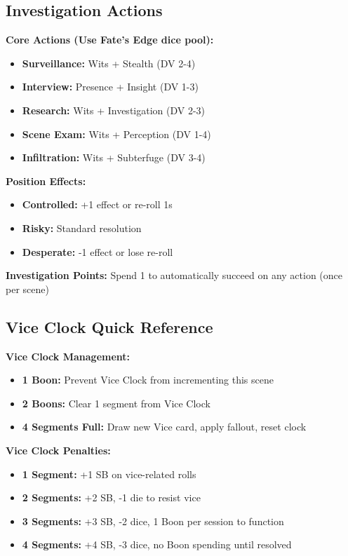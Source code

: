 \documentclass[11pt]{article}
\begin{document}
\subsection{Investigation Actions}

\textbf{Core Actions (Use Fate's Edge dice pool):}
\begin{itemize}
\item \textbf{Surveillance:} Wits + Stealth (DV 2-4)
\item \textbf{Interview:} Presence + Insight (DV 1-3)
\item \textbf{Research:} Wits + Investigation (DV 2-3)
\item \textbf{Scene Exam:} Wits + Perception (DV 1-4)
\item \textbf{Infiltration:} Wits + Subterfuge (DV 3-4)
\end{itemize}

\textbf{Position Effects:}
\begin{itemize}
\item \textbf{Controlled:} +1 effect or re-roll 1s
\item \textbf{Risky:} Standard resolution
\item \textbf{Desperate:} -1 effect or lose re-roll
\end{itemize}

\textbf{Investigation Points:} Spend 1 to automatically succeed on any action (once per scene)

\subsection{Vice Clock Quick Reference}

\textbf{Vice Clock Management:}
\begin{itemize}
\item \textbf{1 Boon:} Prevent Vice Clock from incrementing this scene
\item \textbf{2 Boons:} Clear 1 segment from Vice Clock
\item \textbf{4 Segments Full:} Draw new Vice card, apply fallout, reset clock
\end{itemize}

\textbf{Vice Clock Penalties:}
\begin{itemize}
\item \textbf{1 Segment:} +1 SB on vice-related rolls
\item \textbf{2 Segments:} +2 SB, -1 die to resist vice
\item \textbf{3 Segments:} +3 SB, -2 dice, 1 Boon per session to function
\item \textbf{4 Segments:} +4 SB, -3 dice, no Boon spending until resolved
\end{itemize}
\end{document}
